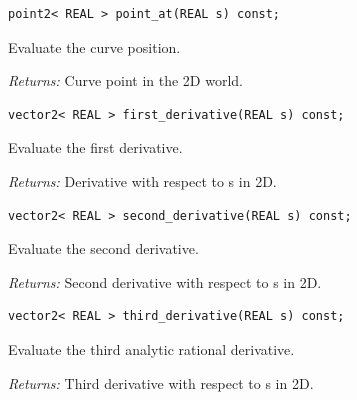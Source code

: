 \par\noindent\begin{minipage}{\linewidth}
\begin{lstlisting}[style=apireference]
point2< REAL > point_at(REAL s) const;
\end{lstlisting}
{\footnotesize Evaluate the curve position.\par}
{\footnotesize\textit{Returns:} Curve point in the 2D world.\par}
\end{minipage}\par\vspace{1pt}
\par\noindent\begin{minipage}{\linewidth}
\begin{lstlisting}[style=apireference]
vector2< REAL > first_derivative(REAL s) const;
\end{lstlisting}
{\footnotesize Evaluate the first derivative.\par}
{\footnotesize\textit{Returns:} Derivative with respect to s in 2D.\par}
\end{minipage}\par\vspace{1pt}
\par\noindent\begin{minipage}{\linewidth}
\begin{lstlisting}[style=apireference]
vector2< REAL > second_derivative(REAL s) const;
\end{lstlisting}
{\footnotesize Evaluate the second derivative.\par}
{\footnotesize\textit{Returns:} Second derivative with respect to s in 2D.\par}
\end{minipage}\par\vspace{1pt}
\par\noindent\begin{minipage}{\linewidth}
\begin{lstlisting}[style=apireference]
vector2< REAL > third_derivative(REAL s) const;
\end{lstlisting}
{\footnotesize Evaluate the third analytic rational derivative.\par}
{\footnotesize\textit{Returns:} Third derivative with respect to s in 2D.\par}
\end{minipage}\par\vspace{1pt}
